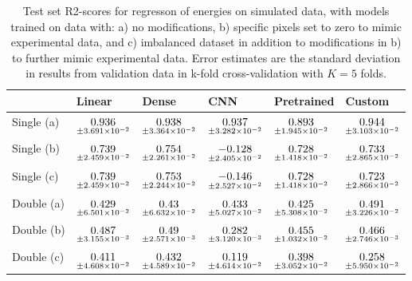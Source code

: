 \begin{table}
\centering
\caption{
Test set R2-scores for regresson of energies on simulated data, with models trained on data with: 
a) no modifications, b) specific pixels set to zero to mimic experimental data, and c) imbalanced dataset
in addition to modifications in b) to further mimic experimental data. Error estimates are the standard deviation 
in results from validation data in k-fold cross-validation with $K=5$ folds.
}
\label{tab:regression-simulated-all-energies-r2}
\begin{tabular}{llllll}
\toprule
{} &                                              Linear &                                               Dense &                                                  CNN &                                          Pretrained &                                              Custom \\
\midrule
Single (a) &  $\underset{\num{+- 3.691e-02 }  }{\num{ 0.936 } }$ &  $\underset{\num{+- 3.364e-02 }  }{\num{ 0.938 } }$ &  $\underset{\num{+- 3.282e-02 }  }{\num{ 0.937 } }$ &  $\underset{\num{+- 1.945e-02 }  }{\num{ 0.893 } }$ &  $\underset{\num{+- 3.103e-02 }  }{\num{ 0.944 } }$ \\
Single (b) &  $\underset{\num{+- 2.459e-02 }  }{\num{ 0.739 } }$ &  $\underset{\num{+- 2.261e-02 }  }{\num{ 0.754 } }$ &  $\underset{\num{+- 2.405e-02 }  }{\num{ -0.128 } }$ &  $\underset{\num{+- 1.418e-02 }  }{\num{ 0.728 } }$ &  $\underset{\num{+- 2.865e-02 }  }{\num{ 0.733 } }$ \\
Single (c) &  $\underset{\num{+- 2.459e-02 }  }{\num{ 0.739 } }$ &  $\underset{\num{+- 2.244e-02 }  }{\num{ 0.753 } }$ &  $\underset{\num{+- 2.527e-02 }  }{\num{ -0.146 } }$ &  $\underset{\num{+- 1.418e-02 }  }{\num{ 0.728 } }$ &  $\underset{\num{+- 2.866e-02 }  }{\num{ 0.723 } }$ \\
Double (a) &  $\underset{\num{+- 6.501e-02 }  }{\num{ 0.429 } }$ &  $\underset{\num{+- 6.632e-02 }  }{\num{ 0.43 } }$ &  $\underset{\num{+- 5.027e-02 }  }{\num{ 0.433 } }$ &  $\underset{\num{+- 5.308e-02 }  }{\num{ 0.425 } }$ &  $\underset{\num{+- 3.226e-02 }  }{\num{ 0.491 } }$ \\
Double (b) &  $\underset{\num{+- 3.155e-03 }  }{\num{ 0.487 } }$ &  $\underset{\num{+- 2.571e-03 }  }{\num{ 0.49 } }$ &  $\underset{\num{+- 3.120e-03 }  }{\num{ 0.282 } }$ &  $\underset{\num{+- 1.032e-02 }  }{\num{ 0.455 } }$ &  $\underset{\num{+- 2.746e-03 }  }{\num{ 0.466 } }$ \\
Double (c) &  $\underset{\num{+- 4.608e-02 }  }{\num{ 0.411 } }$ &  $\underset{\num{+- 4.589e-02 }  }{\num{ 0.432 } }$ &  $\underset{\num{+- 4.614e-02 }  }{\num{ 0.119 } }$ &  $\underset{\num{+- 3.052e-02 }  }{\num{ 0.398 } }$ &  $\underset{\num{+- 5.950e-02 }  }{\num{ 0.258 } }$ \\
\bottomrule
\end{tabular}
\end{table}
